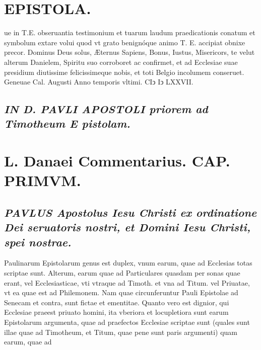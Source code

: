 \documentclass{article}
\begin{document}
\begin{pages}
\section*{EPISTOLA. }\pstart ue in T.E. obseruantia testimonium et tuarum laudum praedicationis conatum et symbolum extare volui quod vt grato benignóque animo T. E. accipiat obnixe precor. Dominus Deus solus, Æternus Sapiens, Bonus, Iustus, Misericors, te velut alterum Danielem, Spiritu suo corroboret ac confirmet, et ad Ecclesiae suae presidium diutissime felicissimeque nobis, et toti Belgio incolumem conseruet. Geneuae Cal. Augusti Anno temporis vltimi. CIↄ Iↄ LXXVII.  \pend
{}
{}
\subsection*{\textit{IN D. PAVLI APOSTOLI priorem ad Timotheum E pistolam. }}
\section{L. Danaei Commentarius. CAP. PRIMVM.}
{}
\subsection*{\textit{\huge\textbf{P}\normalsize AVLUS Apostolus Iesu  Christi ex ordinatione Dei seruatoris nostri, et Domini Iesu Christi, spei nostrae. }}\pstart Paulinarum Epistolarum genus est duplex, vnum earum, quae ad Ecclesias totas scriptae sunt. Alterum, earum quae ad Particulares quasdam per sonas quae erant, vel Ecclesiasticae, vti vtraque ad Timoth. et vna ad Titum. vel Priuatae, vt ea quae est ad Philemonem. Nam quae circunferuntur Pauli Epistolae ad Senecam et contra, sunt fictae et ementitae. Quanto vero est dignior, qui Ecclesiae praeest priuato homini, ita vberiora et locupletiora sunt earum Epistolarum argumenta, quae ad praefectos Ecclesiae scriptae sunt (quales sunt illae quae ad Timotheum, et Titum, quae pene sunt paris argumenti) quam earum, quae ad  \pend

\end{pages}
\end{document}
